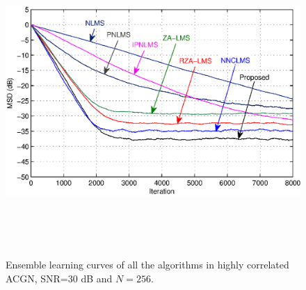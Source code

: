 
\begin{figure}[!htb]
\begin{center}
\vspace{1cm}
\includegraphics[width=14.25cm, height=11cm]{Figures/Chapter5/fig6.eps}\\
\end{center}
\vspace{-1cm}
\caption{Ensemble learning curves of all the algorithms in highly correlated ACGN, SNR=30 dB and $N=256$.}
\label{fig6}
\vspace{1.5cm}
\end{figure}

